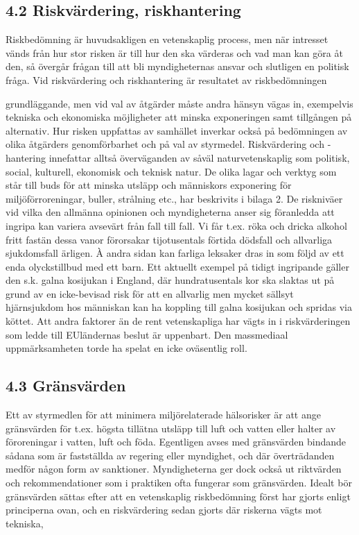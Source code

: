 \subsection*{4.2 Riskvärdering, riskhantering}
Riskbedömning är huvudsakligen en vetenskaplig process, men när intresset vänds från hur stor risken är till hur den ska värderas och vad man kan göra åt den, så övergår frågan till att bli myndigheternas ansvar och slutligen en politisk fråga. Vid riskvärdering och riskhantering är resultatet av riskbedömningen

grundläggande, men vid val av åtgärder måste andra hänsyn vägas in, exempelvis tekniska och ekonomiska möjligheter att minska exponeringen samt tillgången på alternativ. Hur risken uppfattas av samhället inverkar också på bedömningen av olika åtgärders genomförbarhet och på val av styrmedel. Riskvärdering och -hantering innefattar alltså överväganden av såväl naturvetenskaplig som politisk, social, kulturell, ekonomisk och teknisk natur.
De olika lagar och verktyg som står till buds för att minska utsläpp och människors exponering för miljöförroreningar, buller, strålning etc., har beskrivits i bilaga 2.
De riskniväer vid vilka den allmänna opinionen och myndigheterna anser sig föranledda att ingripa kan variera avsevärt från fall till fall. Vi får t.ex. röka och dricka alkohol fritt fastän dessa vanor förorsakar tijotusentals förtida dödsfall och allvarliga sjukdomsfall ärligen. À andra sidan kan farliga leksaker dras in som följd av ett enda olyckstillbud med ett barn. Ett aktuellt exempel på tidigt ingripande gäller den s.k. galna kosijukan i England, där hundratusentals kor ska slaktas ut på grund av en icke-bevisad risk för att en allvarlig men mycket sällsyt hjärnsjukdom hos människan kan ha koppling till galna kosijukan och spridas via köttet. Att andra faktorer än de rent vetenskapliga har vägts in i riskvärderingen som ledde till EUländernas beslut är uppenbart. Den massmediaal uppmärksamheten torde ha spelat en icke oväsentlig roll.
\subsection*{4.3 Gränsvärden}
Ett av styrmedlen för att minimera miljörelaterade hälsorisker är att ange gränsvärden för t.ex. högsta tillätna utsläpp till luft och vatten eller halter av föroreningar i vatten, luft och föda. Egentligen avses med gränsvärden bindande sådana som är fastställda av regering eller myndighet, och där överträdanden medför någon form av sanktioner. Myndigheterna ger dock också ut riktvärden och rekommendationer som i praktiken ofta fungerar som gränsvärden.
Idealt bör gränsvärden sättas efter att en vetenskaplig riskbedömning först har gjorts enligt principerna ovan, och en riskvärdering sedan gjorts där riskerna vägts mot tekniska,

